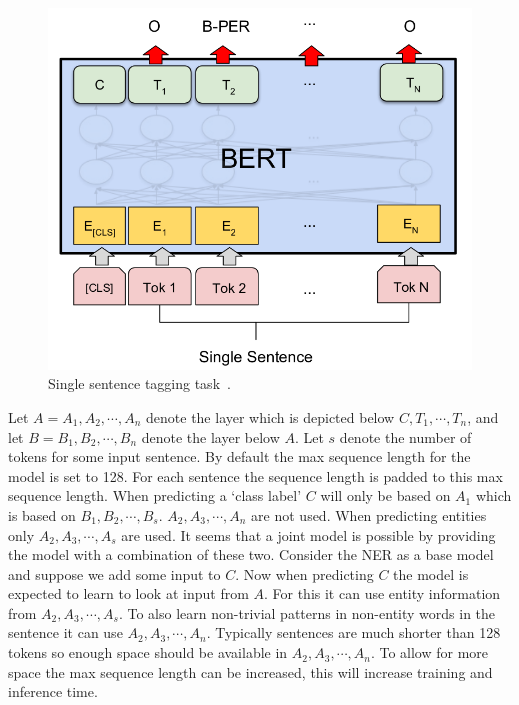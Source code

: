 \begin{figure}[htbp]
    \begin{center}
        \includegraphics[scale=0.3]{figures/bert_ner.png}
    \end{center}
    \caption{Single sentence tagging task~\cite[Figure 3]{devlin2018}.}
    \label{fig:bert_ner}
\end{figure}

Let $A = A_1, A_2, \cdots, A_n$ denote the layer which is depicted below $C, T_1, \cdots, T_n$, and let $B = B_1, B_2, \cdots, B_n$ denote the layer below $A$.
Let $s$ denote the number of tokens for some input sentence.
By default the max sequence length for the model is set to 128.
For each sentence the sequence length is padded to this max sequence length.
When predicting a `class label' $C$ will only be based on $A_1$ which is based on $B_1, B_2, \cdots, B_s$.
$A_2, A_3, \cdots, A_n$ are not used.
When predicting entities only $A_2, A_3, \cdots, A_s$ are used.
It seems that a joint model is possible by providing the model with a combination of these two.
Consider the NER as a base model and suppose we add some input to $C$.
Now when predicting $C$ the model is expected to learn to look at input from $A$.
For this it can use entity information from $A_2, A_3, \cdots, A_s$.
To also learn non-trivial patterns in non-entity words in the sentence it can use $A_2, A_3, \cdots, A_n$.
Typically sentences are much shorter than 128 tokens so enough space should be available in $A_2, A_3, \cdots, A_n$.
To allow for more space the max sequence length can be increased, this will increase training and inference time.

